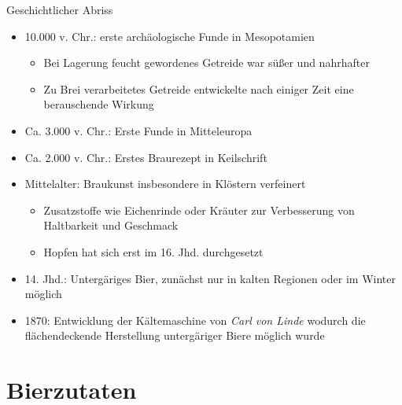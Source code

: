 \documentclass[9pt, ngerman]{beamer}
\begin{document}
\begin{frame}{Geschichtlicher Abriss}
  \begin{itemize}
  	\item 10.000 v. Chr.: erste archäologische Funde in Mesopotamien
  	\begin{itemize}
  		\item Bei Lagerung feucht gewordenes Getreide war süßer und nahrhafter
  		\item Zu Brei verarbeitetes Getreide entwickelte nach einiger Zeit eine berauschende Wirkung
  	\end{itemize}
  	\item Ca. 3.000 v. Chr.: Erste Funde in Mitteleuropa
  	\item Ca. 2.000 v. Chr.: Erstes Braurezept in Keilschrift
  	\item Mittelalter: Braukunst insbesondere in Klöstern verfeinert
  	\begin{itemize}
  		\item Zusatzstoffe wie Eichenrinde oder Kräuter zur Verbesserung von Haltbarkeit und Geschmack
  		\item Hopfen hat sich erst im 16. Jhd. durchgesetzt
  	\end{itemize}
  	\item 14. Jhd.: Untergäriges Bier, zunächst nur in kalten Regionen oder im Winter möglich
  	\item 1870: Entwicklung der Kältemaschine von \emph{Carl von Linde} wodurch die flächendeckende Herstellung untergäriger Biere möglich wurde
  \end{itemize}
\end{frame}

\section{Bierzutaten}
\end{document}
